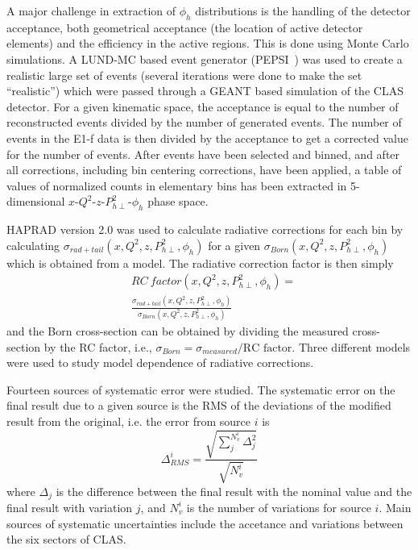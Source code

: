 \documentclass[aps,prl,twocolumn,showpacs,superscriptaddress,groupedaddress]{revtex4}  %
\newcommand{\Phperp}{P_{h\perp}}
\begin{document}
A major challenge in extraction of $\phi_h$ distributions is the handling of the detector acceptance, both geometrical acceptance (the location of active detector elements) and the efficiency in the active regions.
This is done using Monte Carlo simulations.
A LUND-MC based event generator (PEPSI~\cite{Mankiewicz:1991dp}) was used to create a realistic large set of events (several iterations were done to make the set ``realistic'') which were passed through a GEANT based simulation of the CLAS detector.
For a given kinematic space, the acceptance is equal to the number of reconstructed events divided by the number of generated events.
The number of events in the E1-f data is then divided by the acceptance to get a corrected value for the number of events.
After events have been selected and binned, and after all corrections, including bin centering corrections,  have been applied, 
a table of values of normalized counts in elementary bins has been extracted in 5-dimensional $x$-$Q^2$-$z$-$\Phperp^2$-$\phi_h$ phase space.

HAPRAD version 2.0 \cite{Akushevich:1999hz,Akushevich:2007jc} was used to calculate radiative corrections for each bin by calculating $\sigma_{rad+tail} \left( x, Q^2, z, P_{h\perp}^2, \phi_h \right)$ for a given \allowbreak $\sigma_{Born} \left( x, Q^2, z, P_{h\perp}^2, \phi_h \right)$ which is obtained from a model.
The radiative correction factor is then simply
\begin{equation}
\begin{split}
\label{eq:RCfactor}
& RC\ factor \left( x, Q^2, z, P_{h\perp}^2, \phi_h \right) =
\\
& \frac{\sigma_{rad+tail} \left( x, Q^2, z, P_{h\perp}^2, \phi_h \right)}{\sigma_{Born} \left( x, Q^2, z, P_{h\perp}^2, \phi_h \right)}
\end{split}
\end{equation}
and the Born cross-section can be obtained by dividing the measured cross-section by the RC factor, i.e., $\sigma_{Born} = \sigma_{measured}/\text{RC factor}$.
Three different models were used to study model dependence of radiative corrections.

Fourteen sources of systematic error were studied.
The systematic error on the final result due to a given source is the RMS of the deviations of the modified result from the original, i.e. the error from source $i$ is
%
\begin{equation}
\label{eq:RMS}
\Delta_{RMS}^i = \frac{\sqrt{\sum_j^{N_v^i} \Delta_j^2}}{\sqrt{N_v^i}}
\end{equation}
%
where $\Delta_j$ is the difference between the final result with the nominal value and the final result with variation $j$, and $N_v^i$ is the number of variations for source $i$.
Main sources of systematic uncertainties include the accetance and variations between the six sectors of CLAS.
\end{document}
